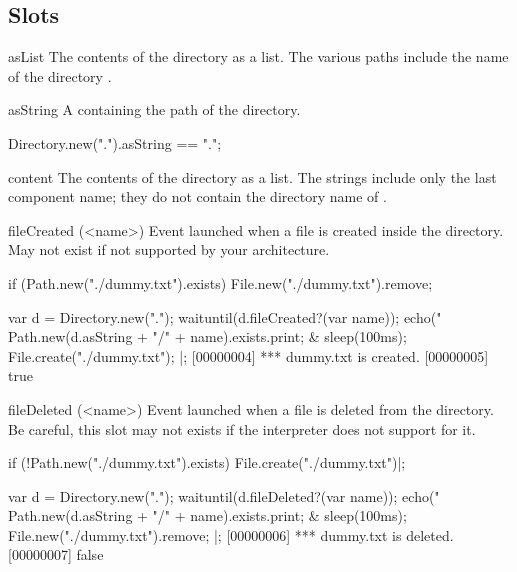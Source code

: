 \subsection{Slots}
\begin{urbiscriptapi}
\item[asList]
  The contents of the directory as a  list.  The
  various paths include the name of the directory \this.

\item[asString] A  containing the path of the directory.

\begin{urbiassert}
Directory.new(".").asString == ".";
\end{urbiassert}


\item[content]
  The contents of the directory as a  list.  The
  strings include only the last component name; they do not contain
  the directory name of \this.

\item[fileCreated](<name>)%
  Event launched when a file is created inside the directory.
  May not exist if not supported by your architecture.

\begin{urbiscript}[firstnumber=1]
if (Path.new("./dummy.txt").exists)
  File.new("./dummy.txt").remove;

  {
    var d = Directory.new(".");
    waituntil(d.fileCreated?(var name));
    echo("%
    Path.new(d.asString + "/" + name).exists.print;
  }
&
  {
    sleep(100ms);
    File.create("./dummy.txt");
  }|;
[00000004] *** dummy.txt is created.
[00000005] true
\end{urbiscript}

\item[fileDeleted](<name>)%
  Event launched when a file is deleted from the directory.  Be careful,
  this slot may not exists if the \us interpreter does not support for it.

\begin{urbiscript}
if (!Path.new("./dummy.txt").exists)
  File.create("./dummy.txt")|;

  {
    var d = Directory.new(".");
    waituntil(d.fileDeleted?(var name));
    echo("%
    Path.new(d.asString + "/" + name).exists.print;
  }
&
  {
    sleep(100ms);
    File.new("./dummy.txt").remove;
  }|;
[00000006] *** dummy.txt is deleted.
[00000007] false
\end{urbiscript}


\end{urbiscriptapi}


